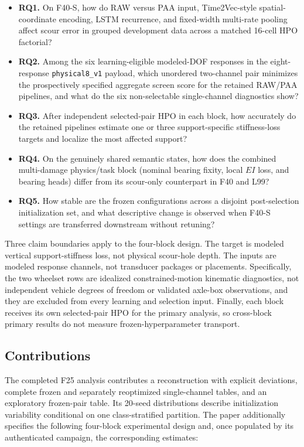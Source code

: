 \begin{itemize}
  \item \textbf{RQ1.} On F40-S, how do RAW versus PAA input, Time2Vec-style
  spatial-coordinate encoding, LSTM recurrence, and fixed-width multi-rate
  pooling affect scour error in grouped development data across a matched 16-cell HPO
  factorial?
  \item \textbf{RQ2.} Among the six learning-eligible modeled-DOF responses in
  the eight-response \texttt{physical8\_v1} payload,
  which unordered two-channel pair minimizes the prospectively specified
  aggregate screen score for the retained RAW/PAA pipelines, and what do the
  six non-selectable single-channel diagnostics show?
  \item \textbf{RQ3.} After independent selected-pair HPO in each block, how
  accurately do the retained pipelines estimate one or three support-specific
  stiffness-loss targets and localize the most affected support?
  \item \textbf{RQ4.} On the genuinely shared semantic states, how does the
  combined multi-damage physics/task block (nominal bearing fixity, local $EI$
  loss, and bearing heads) differ from its scour-only counterpart in F40 and
  L99?
  \item \textbf{RQ5.} How stable are the frozen configurations across a
  disjoint post-selection initialization set, and what descriptive change is
  observed when F40-S settings are transferred downstream without retuning?
\end{itemize}

Three claim boundaries apply to the four-block design. The target is modeled vertical
support-stiffness loss, not physical scour-hole depth. The inputs are modeled
response channels, not transducer packages or placements. Specifically, the
two wheelset rows are idealized constrained-motion kinematic diagnostics, not
independent vehicle degrees of freedom or validated axle-box observations, and
they are excluded from every learning and selection input. Finally, each block
receives its own selected-pair HPO for the primary analysis, so cross-block
primary results do not measure frozen-hyperparameter transport.

\subsection{Contributions}
\label{sec:contributions}

The completed F25 analysis contributes a reconstruction with explicit
deviations, complete frozen and separately reoptimized single-channel tables,
and an exploratory frozen-pair table. Its 20-seed distributions describe
initialization variability conditional on one class-stratified partition.
The paper additionally specifies the following four-block experimental design
and, once populated by its authenticated campaign, the corresponding estimates:


